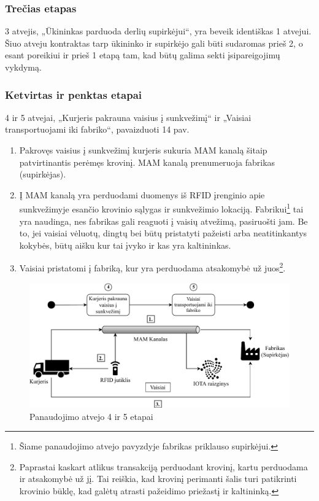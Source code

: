 \subsubsection{Trečias etapas}

3 atvejis, „Ūkininkas parduoda derlių supirkėjui“, yra beveik identiškas 1 atvejui. Šiuo atveju kontraktas tarp ūkininko ir supirkėjo gali būti sudaromas prieš 2, o esant poreikiui ir prieš 1 etapą tam, kad būtų galima sekti įsipareigojimų vykdymą.




\subsubsection{Ketvirtas ir penktas etapai}

4 ir 5 atvejai, „Kurjeris pakrauna vaisius į sunkvežimį“ ir „Vaisiai transportuojami iki fabriko“, pavaizduoti 14 pav.
\begin{enumerate}
    \item Pakrovęs vaisius į sunkvežimį kurjeris sukuria MAM kanalą šitaip patvirtinantis perėmęs krovinį. MAM kanalą prenumeruoja fabrikas (supirkėjas).
    \item Į MAM kanalą yra perduodami duomenys iš RFID įrenginio apie sunkvežimyje esančio krovinio sąlygas ir sunkvežimio lokaciją. Fabrikui\footnote{Šiame panaudojimo atvejo pavyzdyje fabrikas priklauso supirkėjui.} tai yra naudinga, nes fabrikas gali reaguoti į vaisių atvežimą, pasiruošti jam. Be to, jei vaisiai vėluotų, dingtų bei būtų pristatyti pažeisti arba neatitinkantys kokybės, būtų aišku kur tai įvyko ir kas yra kaltininkas.
    \item Vaisiai pristatomi į fabriką, kur yra perduodama atsakomybė už juos\footnote{Paprastai kaskart atlikus transakciją perduodant krovinį, kartu perduodama ir atsakomybė už jį. Tai reiškia, kad krovinį perimanti šalis turi patikrinti krovinio būklę, kad galėtų atrasti pažeidimo priežastį ir kaltininką.}.
\end{enumerate}

\begin{figure}[H]
    \centering
    \includegraphics[scale=0.7]{images/iota-usecase-4-5}
    \caption{Panaudojimo atvejo 4 ir 5 etapai}
\end{figure}



